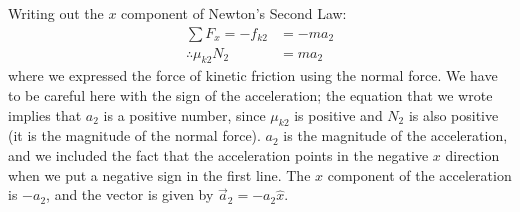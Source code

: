 \begin{example}

Writing out the $x$ component of Newton's Second Law:
\begin{align*}
\sum F_x = -f_{k2} &= -ma_2\\
\therefore \mu_{k2}N_2 &= ma_2
\end{align*}
where we expressed the force of kinetic friction using the normal force. We  have to be careful here with the sign of the acceleration; the equation that we wrote implies that $a_2$ is a positive number, since $\mu_{k2}$ is positive and $N_2$ is also positive (it is the magnitude of the normal force). $a_2$ is the magnitude of the acceleration, and we included the fact that the acceleration points in the negative $x$ direction when we put a negative sign in the first line. The $x$ component of the acceleration is $-a_2$, and the vector is given by $\vec a_2=-a_2\hat x$.


\end{example}
